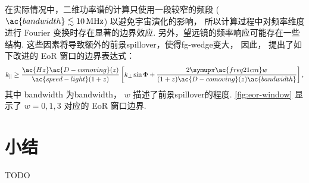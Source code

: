 在实际情况中，二维功率谱的计算只使用一段较窄的频段
($\ac{bandwidth} \lesssim \SI{10}{\MHz}$) 以避免宇宙演化的影响，
所以计算过程中对频率维度进行 Fourier 变换时存在显著的边界效应.
另外，望远镜的频率响应可能存在一些结构.
这些因素将导致额外的前景\ac{spillover}，使得\ac{fg-wedge}变大，
因此， 提出了如下改进的 EoR 窗口的边界表达式：
\begin{equation}
  \label{eq:eor-window}
  \klos \ge
    \frac{\ac{Hz} \ac{D-comoving}(z)}{\ac{speed-light} (1+z)}
    \left[ \kperp \sin\Phi
      + \frac{2\Cpi\ac{freq21cm} w}{(1+z) \ac{D-comoving}(z)
        \ac{bandwidth}} \right] ,
\end{equation}
其中 \ac{bandwidth} 为\acl{bandwidth}，
$w$ 描述了前景\ac{spillover}的程度.
\autoref{fig:eor-window} 显示了 $w = 0, 1, 3$ 对应的 EoR 窗口边界.


\section{小结}

TODO


